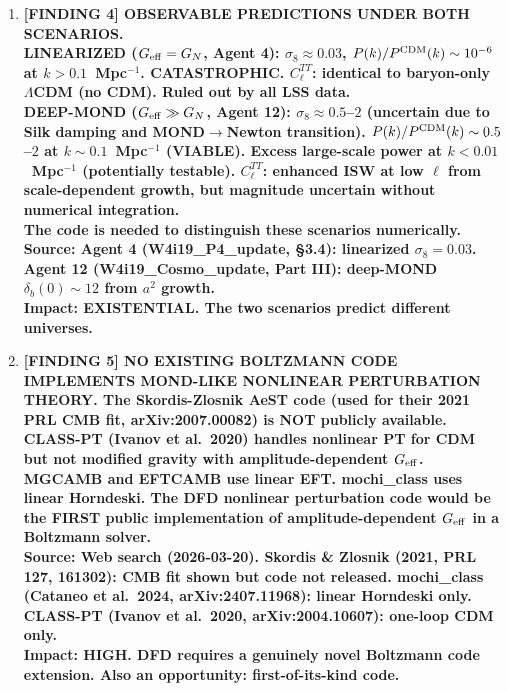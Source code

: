 \documentclass[11pt]{article}
\theoremstyle{definition}
\theoremstyle{remark}
\newcommand{\Geff}{G_{\rm eff}}
\begin{document}
\begin{tcolorbox}[colback=blue!5!white, colframe=blue!60!black,
  title=\textbf{W4i20 TOP 5 FINDINGS --- RANKED BY IMPACT}]
\begin{enumerate}[nosep]
\item \textbf{[FINDING 4] OBSERVABLE PREDICTIONS UNDER BOTH SCENARIOS.\\
  LINEARIZED ($\Geff = G_N$, Agent 4):
  $\sigma_8 \approx 0.03$, $P(k)/P^{\rm CDM}(k) \sim 10^{-6}$
  at $k > 0.1$~Mpc$^{-1}$. CATASTROPHIC.
  $C_\ell^{TT}$: identical to baryon-only $\Lambda$CDM (no CDM).
  Ruled out by all LSS data.\\
  DEEP-MOND ($\Geff \gg G_N$, Agent 12):
  $\sigma_8 \approx 0.5$--$2$ (uncertain due to Silk damping and
  MOND$\to$Newton transition).
  $P(k)/P^{\rm CDM}(k) \sim 0.5$--$2$ at $k \sim 0.1$~Mpc$^{-1}$
  (VIABLE). Excess large-scale power at $k < 0.01$~Mpc$^{-1}$
  (potentially testable). $C_\ell^{TT}$: enhanced ISW at low $\ell$
  from scale-dependent growth, but magnitude uncertain without
  numerical integration.\\
  The code is needed to distinguish these scenarios numerically.}\\
  \textbf{Source: Agent 4 (W4i19\_P4\_update, \S3.4): linearized
  $\sigma_8 = 0.03$. Agent 12 (W4i19\_Cosmo\_update, Part III):
  deep-MOND $\delta_b(0) \sim 12$ from $a^2$ growth.}\\
  \textbf{Impact: EXISTENTIAL. The two scenarios predict different
  universes.}

\item \textbf{[FINDING 5] NO EXISTING BOLTZMANN CODE IMPLEMENTS
  MOND-LIKE NONLINEAR PERTURBATION THEORY. The Skordis-Zlosnik AeST
  code (used for their 2021 PRL CMB fit, arXiv:2007.00082) is NOT
  publicly available. CLASS-PT (Ivanov et al.\ 2020) handles
  nonlinear PT for CDM but not modified gravity with
  amplitude-dependent $\Geff$. MGCAMB and EFTCAMB use linear EFT.
  mochi\_class uses linear Horndeski. The DFD nonlinear perturbation
  code would be the FIRST public implementation of amplitude-dependent
  $\Geff$ in a Boltzmann solver.}\\
  \textbf{Source: Web search (2026-03-20). Skordis \& Zlosnik (2021,
  PRL 127, 161302): CMB fit shown but code not released. mochi\_class
  (Cataneo et al.\ 2024, arXiv:2407.11968): linear Horndeski only.
  CLASS-PT (Ivanov et al.\ 2020, arXiv:2004.10607): one-loop CDM
  only.}\\
  \textbf{Impact: HIGH. DFD requires a genuinely novel Boltzmann
  code extension. Also an opportunity: first-of-its-kind code.}

\end{enumerate}
\end{tcolorbox}
\end{document}
